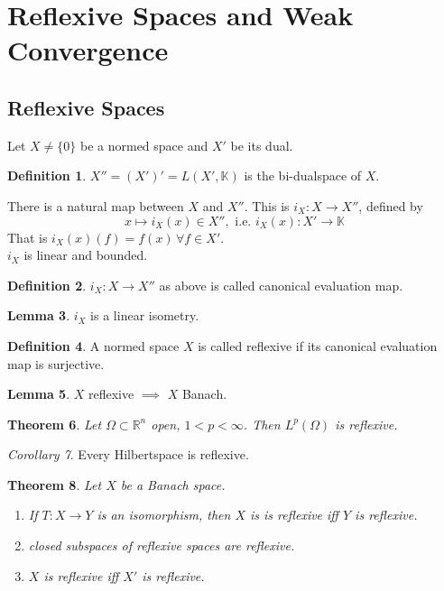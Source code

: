 \documentclass[a4paper, 12pt]{article}
\theoremstyle{plain}
\newtheorem{theorem}{Theorem}[subsection] %
\theoremstyle{definition}
\newtheorem{definition}[theorem]{Definition} %
\theoremstyle{lemma}
\newtheorem{lemma}[theorem]{Lemma}
\theoremstyle{remark}
\theoremstyle{corollary}
\newtheorem{corollary}[theorem]{Corollary}
\theoremstyle{example}
\begin{document}
	\section{Reflexive Spaces and Weak Convergence}
	\subsection{Reflexive Spaces}
	Let $X \neq \{0\}$ be a normed space and $X'$ be its dual.
	\begin{definition}
		$X'' = (X')' = L(X',\mathbb{K})$ is the bi-dualspace of $X$.
	\end{definition}
	There is a natural map between $X$ and $X''$. This is $i_X: X \to X''$, defined by \[x\mapsto i_X(x) \in X'', \text{ i.e. } i_X(x):X'\to\mathbb{K}\]
	That is $i_X(x)(f) = f(x)\, \forall f \in X'$.\\
	$i_X$ is linear and bounded.
	\begin{definition}
		$i_X:X\to X''$ as above is called canonical evaluation map. 
	\end{definition}
	\begin{lemma}
		$i_X$ is a linear isometry.
	\end{lemma}
	\begin{definition}
		A normed space $X$ is called reflexive if its canonical evaluation map is surjective.
	\end{definition}
	\begin{lemma}
		$X$ reflexive $\implies$ $X$ Banach.
	\end{lemma}
	\begin{theorem}
		Let $\Omega \subset \mathbb{R}^n$ open, $1<p<\infty$. Then $L^p(\Omega)$ is reflexive.
	\end{theorem}
	\begin{corollary}
		Every Hilbertspace is reflexive.
	\end{corollary}
	\begin{theorem}
		Let $X$ be a Banach space. \begin{enumerate}
			\item If $T:X\to Y$ is an isomorphism, then $X$ is is reflexive iff $Y$ is reflexive.
			\item closed subspaces of reflexive spaces are reflexive.
			\item $X$ is reflexive iff $X'$ is reflexive.
		\end{enumerate}
	\end{theorem}
\end{document}
